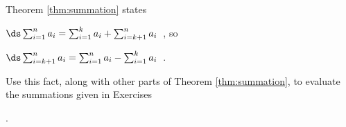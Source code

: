 {\noindent Theorem \ref{thm:summation} states

$\ds \sum_{i=1}^na_i = \sum_{i=1}^k a_i + \sum_{i=k+1}^n a_i$\ , so 

$\ds \sum_{i=k+1}^na_i = \sum_{i=1}^n a_i - \sum_{i=1}^k a_i$\ .

\noindent Use this fact, along with other parts of Theorem \ref{thm:summation}, to evaluate the summations given in Exercises}
{.}

